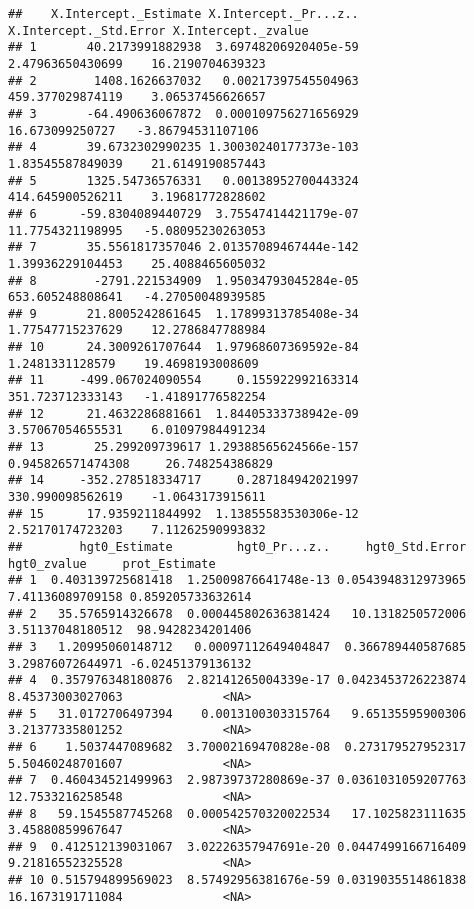 \documentclass[
]{book}
\begin{document}
\begin{verbatim}
##    X.Intercept._Estimate X.Intercept._Pr...z.. X.Intercept._Std.Error X.Intercept._zvalue
## 1       40.2173991882938  3.69748206920405e-59       2.47963650430699    16.2190704639323
## 2        1408.1626637032   0.00217397545504963       459.377029874119    3.06537456626657
## 3       -64.490636067872  0.000109756271656929        16.673099250727   -3.86794531107106
## 4       39.6732302990235 1.30030240177373e-103       1.83545587849039    21.6149190857443
## 5       1325.54736576331   0.00138952700443324       414.645900526211    3.19681772828602
## 6      -59.8304089440729  3.75547414421179e-07       11.7754321198995   -5.08095230263053
## 7       35.5561817357046 2.01357089467444e-142       1.39936229104453    25.4088465605032
## 8        -2791.221534909  1.95034793045284e-05       653.605248808641   -4.27050048939585
## 9       21.8005242861645  1.17899313785408e-34       1.77547715237629    12.2786847788984
## 10      24.3009261707644  1.97968607369592e-84        1.2481331128579    19.4698193008609
## 11     -499.067024090554     0.155922992163314       351.723712333143   -1.41891776582254
## 12      21.4632286881661  1.84405333738942e-09       3.57067054655531    6.01097984491234
## 13       25.299209739617 1.29388565624566e-157      0.945826571474308     26.748254386829
## 14     -352.278518334717     0.287184942021997       330.990098562619    -1.0643173915611
## 15      17.9359211844992  1.13855583530306e-12       2.52170174723203    7.11262590993832
##        hgt0_Estimate         hgt0_Pr...z..     hgt0_Std.Error      hgt0_zvalue     prot_Estimate
## 1  0.403139725681418  1.25009876641748e-13 0.0543948312973965 7.41136089709158 0.859205733632614
## 2   35.5765914326678  0.000445802636381424   10.1318250572006 3.51137048180512  98.9428234201406
## 3   1.20995060148712   0.00097112649404847  0.366789440587685 3.29876072644971 -6.02451379136132
## 4  0.357976348180876  2.82141265004339e-17 0.0423453726223874 8.45373003027063              <NA>
## 5   31.0172706497394    0.0013100303315764   9.65135595900306 3.21377335801252              <NA>
## 6    1.5037447089682  3.70002169470828e-08  0.273179527952317 5.50460248701607              <NA>
## 7  0.460434521499963  2.98739737280869e-37 0.0361031059207763 12.7533216258548              <NA>
## 8   59.1545587745268  0.000542570320022534   17.1025823111635 3.45880859967647              <NA>
## 9  0.412512139031067  3.02226357947691e-20 0.0447499166716409 9.21816552325528              <NA>
## 10 0.515794899569023  8.57492956381676e-59 0.0319035514861838 16.1673191711084              <NA>

\end{verbatim}
\end{document}
